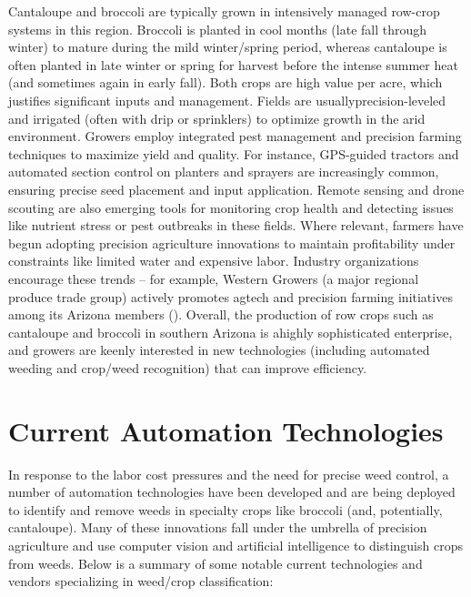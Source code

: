 \documentclass[letterpaper]{report}
\begin{document}
Cantaloupe and broccoli are typically grown in intensively managed row-crop systems in this region. Broccoli is planted in cool months (late fall through winter) to mature during the mild winter/spring period, whereas cantaloupe is often planted in late winter or spring for harvest before the intense summer heat (and sometimes again in early fall). Both crops are high value per acre, which justifies significant inputs and management. Fields are usuallyprecision-leveled and irrigated (often with drip or sprinklers) to optimize growth in the arid environment. Growers employ integrated pest management and precision farming techniques to maximize yield and quality. For instance, GPS-guided tractors and automated section control on planters and sprayers are increasingly common, ensuring precise seed placement and input application. Remote sensing and drone scouting are also emerging tools for monitoring crop health and detecting issues like nutrient stress or pest outbreaks in these fields. Where relevant, farmers have begun adopting precision agriculture innovations to maintain profitability under constraints like limited water and expensive labor. Industry organizations encourage these trends – for example, Western Growers (a major regional produce trade group) actively promotes agtech and precision farming initiatives among its Arizona members (\cite{Arizona-Department-of-Agriculture2018-dx}). Overall, the production of row crops such as cantaloupe and broccoli in southern Arizona is ahighly sophisticated enterprise, and growers are keenly interested in new technologies (including automated weeding and crop/weed recognition) that can improve efficiency.

\section{Current Automation Technologies}

In response to the labor cost pressures and the need for precise weed control, a number of automation technologies have been developed and are being deployed to identify and remove weeds in specialty crops like broccoli (and, potentially, cantaloupe). Many of these innovations fall under the umbrella of precision agriculture and use computer vision and artificial intelligence to distinguish crops from weeds. Below is a summary of some notable current technologies and vendors specializing in weed/crop classification:
\end{document}
